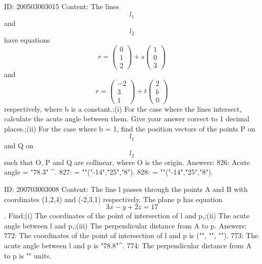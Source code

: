 \documentclass{article}
\begin{document}
ID: 200503003015
Content:
The lines $$l_1$$ and $$l_2$$ have equations  $$r = \begin{pmatrix}0\\ 1\\ 2\end{pmatrix} + s\begin{pmatrix}1\\ 0\\ 3\end{pmatrix} $$ and $$r = \begin{pmatrix}-2\\ 3\\ 1\end{pmatrix} + t\begin{pmatrix}2\\ b\\ 0\end{pmatrix}$$ respectively, where b is a constant.;(i) For the case where the lines intersect, calculate the acute angle between them. Give your answer correct to 1 decimal places.;(ii) For the case where b = 1, find the position vectors of the points P on $$l_1$$ and Q on $$l_2$$ such that O, P and Q are collinear, where O is the origin. Answers:
826: Acute angle = "78.3" ^{\circ}.
827:  = ""("-14","25","8").
828:  = ""("-14","25","8").

ID: 200703003008
Content:
The line l passes through the points A and B with coordinates (1,2,4) and (-2,3,1) respectively. The plane p has equation $$3x-y+2z=17$$ . Find;(i) The coordinates of the point of intersection of l and p,;(ii) The acute angle between l and p,;(iii) The perpendicular distance from A to p.  Answers:
772: The coordinates of the point of intersection of l and p is ("", "", "").
773: The acute angle between l and p is "78.8"^{\circ}.
774: The perpendicular distance from A to p is "" units.
\end{document}
